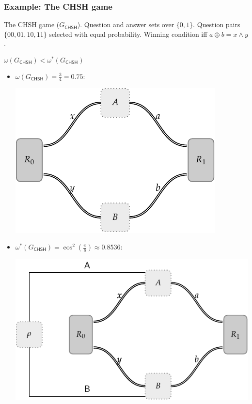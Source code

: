 \documentclass{beamer}
\def\CHSH{\mathsf{CHSH}}
\begin{document}
\begin{frame}
	\frametitle{Example: The CHSH game}		
	The CHSH game ($G_{\CHSH}$). Question and answer sets over $\{0,1\}$. Question pairs $\{ 00, 01, 10, 11 \}$ selected with equal probability. Winning condition iff $a \oplus b = x \land y$.
	\begin{center}
			$\omega(G_{\CHSH}) < \omega^*(G_{\CHSH})$
	\end{center}

	\begin{itemize}
		\item $\omega(G_{\CHSH}) = \frac{3}{4} = 0.75$:
		\begin{center}
			\includegraphics[scale=0.4]{figures/two_player_game.pdf}
		\end{center}
		\item $\omega^*(G_{\CHSH}) = \cos^2(\frac{\pi}{8}) \approx 0.8536$:
		\begin{center}
			\includegraphics[scale=0.4]{figures/nonlocal_game_2.pdf}
		\end{center}		
	\end{itemize}
\end{frame}
\end{document}
